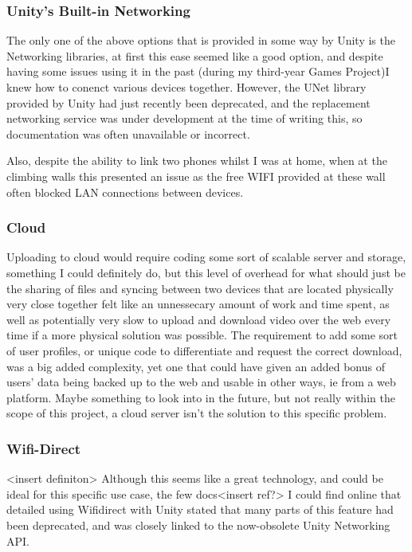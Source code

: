 \subsubsection{Unity's Built-in Networking}
The only one of the above options that is provided in some way by Unity is the Networking libraries, at first this ease seemed like a good option, and despite having some issues using it in the past (during my third-year Games Project)I knew how to conenct various devices together.
However, the UNet library provided by Unity had just recently been deprecated, and the replacement networking service was under development at the time of writing this, so documentation was often unavailable or incorrect.

Also, despite the ability to link two phones whilst I was at home, when at the climbing walls this presented an issue as the free WIFI provided at these wall often blocked LAN connections between devices.

\subsubsection{Cloud}
Uploading to cloud would require coding some sort of scalable server and storage, something I could definitely do, but this level of overhead for what should just be the sharing of files and syncing between two devices that are located physically very close together felt like an unnessecary amount of work and time spent, as well as potentially very slow to upload and download video over the web every time if a more physical solution was possible.
The requirement to add some sort of user profiles, or unique code to differentiate and request the correct download, was a big added complexity, yet one that could have given an added bonus of users' data being backed up to the web and usable in other ways, ie from a web platform.
Maybe something to look into in the future, but not really within the scope of this project, a cloud server isn't the solution to this specific problem.

\subsubsection{Wifi-Direct}
<insert definiton>
Although this seems like a great technology, and could be ideal for this specific use case, the few docs<insert ref?> I could find online that detailed using Wifidirect with Unity stated that many parts of this feature had been deprecated, and was closely linked to the now-obsolete Unity Networking API.


